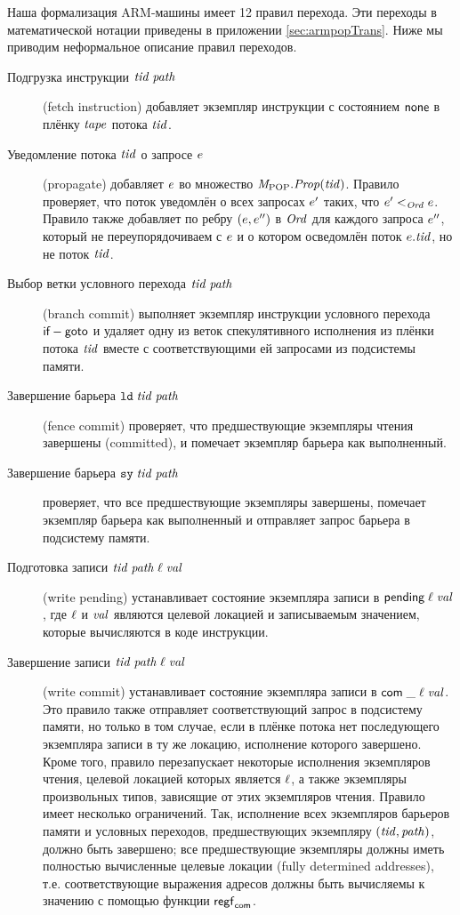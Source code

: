 Наша формализация ARM-машины имеет 12 правил перехода.
Эти переходы в математической нотации приведены в приложении \ref{sec:armpopTrans}.
Ниже мы приводим неформальное описание правил переходов.
\begin{description}
\item[Подгрузка инструкции $\mathit{tid} \; \mathit{path}$] (fetch instruction)
  добавляет экземпляр инструкции с состоянием $\mathsf{none}$
  в плёнку $\mathit{tape}$ потока  $\mathit{tid}$.

\item[Уведомление потока $\mathit{tid}$ о запросе $e$] (propagate)
  добавляет $e$ во множество $\mathit{M}_{\mathrm{POP}}.\mathit{Prop}(\mathit{tid})$.
  Правило проверяет, что поток уведомлён о всех запросах $e'$ таких, что $e' <_{\mathit{Ord}} e$.
  Правило также добавляет по ребру $(e, e'')$ в $\mathit{Ord}$ для каждого запроса $e''$,
  который не переупорядочиваем с $e$ и о котором осведомлён поток $e.\mathit{tid}$,
  но не поток $\mathit{tid}$.

\item[Выбор ветки условного перехода $\mathit{tid} \; \mathit{path}$] (branch commit)
  выполняет экземпляр инструкции условного перехода $\textsf{if}-\textsf{goto}$ и
  удаляет одну из веток спекулятивного исполнения из плёнки потока $\mathit{tid}$ вместе
  с соответствующими ей запросами из подсистемы памяти.

\item[Завершение барьера $\mathtt{ld} \; \mathit{tid} \; \mathit{path}$] (fence commit)
  проверяет, что предшествующие экземпляры чтения завершены (committed),
  и помечает экземпляр барьера как выполненный.
\item[Завершение барьера $\mathtt{sy} \; \mathit{tid} \; \mathit{path}$]
  проверяет, что все предшествующие экземпляры завершены,
  помечает экземпляр барьера как выполненный и отправляет запрос барьера
  в подсистему памяти.
  
\item[Подготовка записи $\mathit{tid} \; \mathit{path} \; \ell \; \mathit{val}$] (write pending)
  устанавливает состояние экземпляра записи в $\textsf{pending} \; \ell \; \mathit{val}$,
  где $\ell$ и $\mathit{val}$ являются целевой локацией и записываемым значением,
  которые вычисляются в коде инструкции.

\item[Завершение записи $\mathit{tid} \; \mathit{path} \; \ell \; \mathit{val}$] (write commit)
  устанавливает состояние экземпляра записи в $\mathsf{com} \; \_ \; \ell \; \mathit{val}$.
  Это правило также отправляет соответствующий запрос в подсистему памяти,
  но только в том случае, если в плёнке потока нет последующего экземпляра записи
  в ту же локацию, исполнение которого завершено.
  Кроме того, правило перезапускает некоторые исполнения экземпляров чтения, целевой
  локацией которых является $\ell$, а также экземпляры произвольных типов, зависящие
  от этих экземпляров чтения.
  Правило имеет несколько ограничений.
  Так, исполнение всех экземпляров барьеров памяти и условных
  переходов, предшествующих экземпляру $(\mathit{tid}, \mathit{path})$, должно быть завершено;
  все предшествующие экземпляры должны иметь полностью вычисленные целевые
  локации (fully determined addresses), т.е. соответствующие выражения адресов
  должны быть вычисляемы к значению с помощью функции $\mathsf{regf}_\mathsf{com}$.


\end{description}

